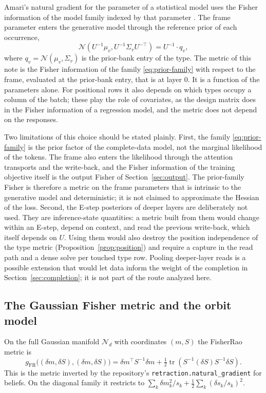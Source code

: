 \documentclass[11pt]{article}
\theoremstyle{definition}
\theoremstyle{remark}
\newcommand{\tr}{\operatorname{tr}}
\newcommand{\Normal}{\mathcal{N}}
\newcommand{\ndash}{\textendash}
\begin{document}
Amari's natural gradient for the parameter of a statistical model uses the Fisher information of the model family indexed by that parameter \cite{Amari1998,AmariNagaoka2000}. The frame parameter enters the generative model through the reference prior of each occurrence,
\begin{equation}\label{eq:prior-family}
\Normal\left(U^{-1}\mu_v,U^{-1}\Sigma_vU^{-\top}\right)=U^{-1}\cdot q_v,
\end{equation}
where $q_v=\Normal(\mu_v,\Sigma_v)$ is the prior-bank entry of the type. The metric of this note is the Fisher information of the family \eqref{eq:prior-family} with respect to the frame, evaluated at the prior-bank entry, that is at layer $0$. It is a function of the parameters alone. For positional rows it also depends on which types occupy a column of the batch; these play the role of covariates, as the design matrix does in the Fisher information of a regression model, and the metric does not depend on the responses.

Two limitations of this choice should be stated plainly. First, the family \eqref{eq:prior-family} is the prior factor of the complete-data model, not the marginal likelihood of the tokens. The frame also enters the likelihood through the attention transports and the write-back, and the Fisher information of the training objective itself is the output Fisher of Section~\ref{sec:output}. The prior-family Fisher is therefore a metric on the frame parameters that is intrinsic to the generative model and deterministic; it is not claimed to approximate the Hessian of the loss. Second, the E-step posteriors of deeper layers are deliberately not used. They are inference-state quantities: a metric built from them would change within an E-step, depend on context, and read the previous write-back, which itself depends on $U$. Using them would also destroy the position independence of the type metric (Proposition~\ref{prop:position}) and require a capture in the read path and a dense solve per touched type row. Pooling deeper-layer reads is a possible extension that would let data inform the weight of the completion in Section~\ref{sec:completion}; it is not part of the route analyzed here.

\subsection{The Gaussian Fisher metric and the orbit model}

On the full Gaussian manifold $\Normal_d$ with coordinates $(m,S)$ the Fisher\ndash Rao metric \cite{Skovgaard1984} is
\begin{equation}\label{eq:gaussian-fisher}
g_{\mathrm{FR}}\big((\delta m,\delta S),(\delta m,\delta S)\big)=\delta m^\top S^{-1}\delta m+\tfrac12\tr\left(S^{-1}(\delta S)S^{-1}\delta S\right).
\end{equation}
This is the metric inverted by the repository's \texttt{retraction.natural\_gradient} for beliefs. On the diagonal family it restricts to $\sum_k\delta m_k^2/s_k+\frac12\sum_k(\delta s_k/s_k)^2$.
\end{document}
